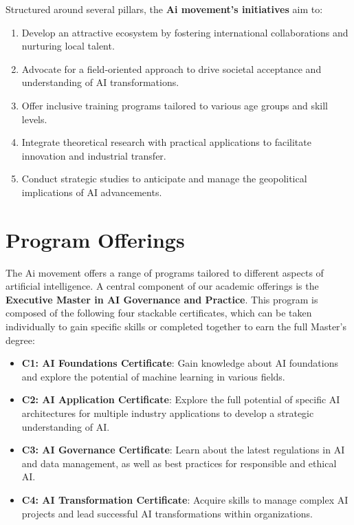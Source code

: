 Structured around several pillars, the \textbf{Ai movement's initiatives} aim to:

\begin{enumerate}
    \item Develop an attractive ecosystem by fostering international collaborations and nurturing local talent.
    \item Advocate for a field-oriented approach to drive societal acceptance and understanding of AI transformations.
    \item Offer inclusive training programs tailored to various age groups and skill levels.
    \item Integrate theoretical research with practical applications to facilitate innovation and industrial transfer.
    \item Conduct strategic studies to anticipate and manage the geopolitical implications of AI advancements.

\end{enumerate}




 \section{Program Offerings}

The Ai movement offers a range of programs tailored to different aspects of artificial intelligence. A central component of our academic offerings is the \textbf{Executive Master in AI Governance and Practice}. This program is composed of the following four stackable certificates, which can be taken individually to gain specific skills or completed together to earn the full Master's degree:

\begin{itemize}
    \item \textbf{C1: AI Foundations Certificate}: Gain knowledge about AI foundations and explore the potential of machine learning in various fields.
    \item \textbf{C2: AI Application Certificate}: Explore the full potential of specific AI architectures for multiple industry applications to develop a strategic understanding of AI.
    \item \textbf{C3: AI Governance Certificate}: Learn about the latest regulations in AI and data management, as well as best practices for responsible and ethical AI.
    \item \textbf{C4: AI Transformation Certificate}: Acquire skills to manage complex AI projects and lead successful AI transformations within organizations.
\end{itemize}

